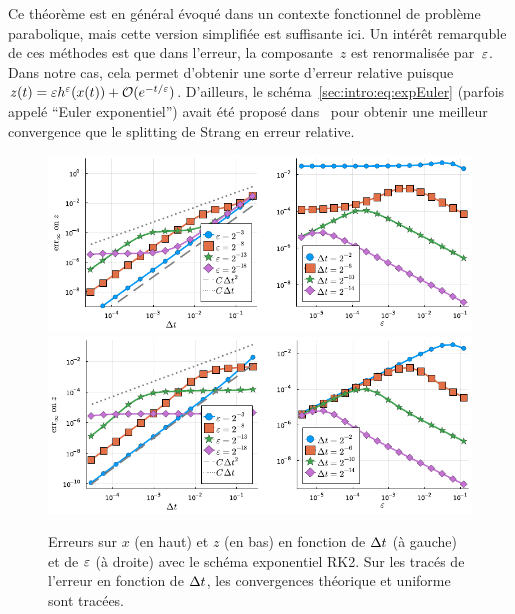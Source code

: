 \noindent%
Ce théorème est en général évoqué dans un contexte fonctionnel de problème parabolique, mais cette version simplifiée est suffisante ici. Un intérêt remarquble de ces méthodes est que dans l'erreur, la composante~$z$ est renormalisée par~$\varepsilon$. Dans notre cas, cela permet d'obtenir une sorte d'erreur relative puisque $z(t) = \varepsilon h^{\varepsilon}(x(t)) + \mathcal{O}(e^{-t/\varepsilon})$. D'ailleurs, le schéma~\eqref{sec:intro:eq:expEuler} (parfois appelé \enquote{Euler exponentiel}) avait été proposé dans~\cite{verwer.1998.note} pour obtenir une meilleur convergence que le splitting de Strang en erreur relative. 

\begin{figure}
    \centering
    \includegraphics[width=\textwidth]{./Presentation/rk2_err_x.pdf}
    \includegraphics[width=\textwidth]{./Presentation/rk2_err_z.pdf}
    \caption{Erreurs sur $x$ (en haut) et $z$ (en bas) en fonction de $\Delta t$ (à gauche) et de $\varepsilon$ (à droite) avec le schéma exponentiel RK2. Sur les tracés de l'erreur en fonction de $\Delta t$, les convergences théorique et uniforme sont tracées.}
    \label{sec:intro:fig:rk2}
\end{figure}

